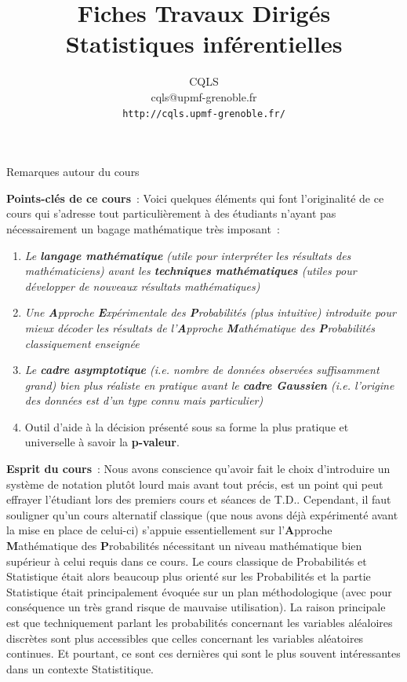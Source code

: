 \documentclass[10pt]{report}
\title{\huge Fiches Travaux Dirigés\\Statistiques inférentielles}
\author{CQLS \\ cqls@upmf-grenoble.fr \\
\texttt{http://cqls.upmf-grenoble.fr/}}
\date{ }
\begin{document}
\maketitle



\pagestyle{empty}
\begin{IndicList}{Remarques autour du cours}
\item {\small\textbf{Points-clés de ce cours}~:  Voici quelques éléments qui font l'originalité de ce cours qui s'adresse tout particulièrement à des étudiants n'ayant pas nécessairement un bagage mathématique très imposant~:
\begin{enumerate}
\item \textit{Le \textbf{langage mathématique} (utile pour interpréter les résultats des mathématiciens) avant les \textbf{techniques mathématiques} (utiles pour développer de nouveaux résultats mathématiques)} 
\item \textit{Une \textbf{A}pproche \textbf{E}xpérimentale des \textbf{P}robabilités (plus intuitive) introduite pour mieux décoder les résultats de l'\textbf{A}pproche \textbf{M}athématique des \textbf{P}robabilités classiquement enseignée} 
\item \textit{Le \textbf{cadre asymptotique} (i.e. nombre de données observées suffisamment grand) bien plus réaliste en pratique avant le \textbf{cadre Gaussien} (i.e. l'origine des données est d'un type connu mais particulier)}
\item Outil d'aide à la décision présenté sous sa forme la plus pratique et universelle à savoir la \textbf{p-valeur}.
\end{enumerate}}
\item {\small\textbf{Esprit du cours}~:  Nous avons conscience qu'avoir fait le choix d'introduire un système de notation plutôt lourd mais avant tout précis, est un point qui peut effrayer l'étudiant lors des premiers cours et séances de T.D.. Cependant, il faut souligner qu'un cours alternatif classique (que nous avons déjà expérimenté avant la mise en place de celui-ci) s'appuie essentiellement sur l'\textbf{A}pproche \textbf{M}athématique des \textbf{P}robabilités nécessitant un niveau mathématique bien supérieur à celui requis dans ce cours.
Le cours classique de Probabilités et Statistique était alors beaucoup plus orienté sur les Probabilités et la partie Statistique était principalement évoquée sur un plan méthodologique (avec pour conséquence un très grand risque de mauvaise utilisation). La raison principale est que techniquement parlant les probabilités concernant les variables aléaloires discrètes sont plus accessibles que celles concernant les variables aléatoires continues. Et pourtant, ce sont ces dernières qui sont le plus souvent intéressantes dans un contexte Statistitique.
}
\end{IndicList}
\end{document}
